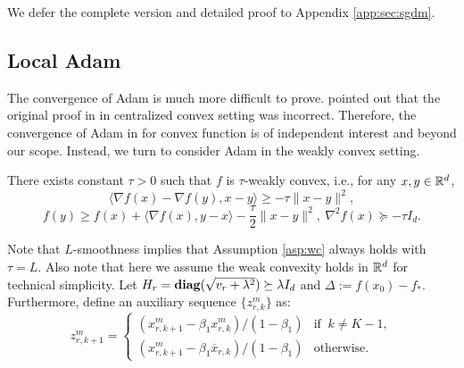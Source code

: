\documentclass{article} %
\numberwithin{equation}{section}
\begin{document}
We defer the complete version and detailed proof to Appendix \ref{app:sec:sgdm}.

\subsection{Local Adam}\label{subsec:local_adam}
    The convergence of Adam is much more difficult to prove. 
    \cite{reddi2019convergence} pointed out that the original proof in \citet{kingma2014adam} in centralized convex setting was incorrect.
    Therefore, the convergence of Adam in for convex function is of independent interest and beyond our scope.
    Instead, we turn to consider Adam in the weakly convex setting.

\begin{asp}\label{asp:wc}
    There exists constant $\tau>0$ such that $f$ is $\tau$-weakly convex, i.e., for any $x,y\in \mathbb{R}^d$,
    \begin{equation}\label{eq:weak-mono}
        \langle \nabla f(x) - \nabla f(y), x-y \rangle \geq -\tau \|x-y\|^2, 
    \end{equation}
     \begin{equation}
        f(y) \geq f(x) + \langle \nabla f(x), y-x\rangle - \frac{\tau}{2}\|x-y\|^2,\
        \nabla^2 f(x) \succeq -\tau I_d.
    \end{equation}
\end{asp}
    Note that $L$-smoothness implies that Assumption \ref{asp:wc} always holds with $\tau=L$.
    Also note that here we assume the weak convexity holds in $\mathbb{R}^d$ for technical simplicity.
    Let $H_r = \mbox{\bf diag}{(\sqrt{v_r+\lambda^2})} \succeq \lambda I_d$ and $\Delta:=f(x_0)-f_*$.
    Furthermore, define an auxiliary sequence $\{z_{r,k}^m\}$ as:
    \begin{equation}
        z_{r,k+1}^m = \left\{
        \begin{array}{ll}
            (x_{r,k+1}^m-\beta_1x_{r,k}^m)/(1-\beta_1) & \text{if $\ k\neq K-1$}, \\
            (x_{r,k+1}^m-\beta_1\overline{x}_{r,k})/(1-\beta_1) & \text{otherwise}.
        \end{array}
        \right.
    \end{equation}
\end{document}
